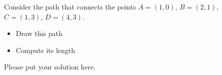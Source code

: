 \begin{problem}
Consider the path that connects the points $A = (1,0)$,
$B = (2,1)$, $C = (1,3)$, $D = (4,3)$.

\medskip
\begin{itemize}
\item Draw this path
\item Compute its length
\end{itemize}
\end{problem}

\begin{solution}
Please put your solution here.
\end{solution}


